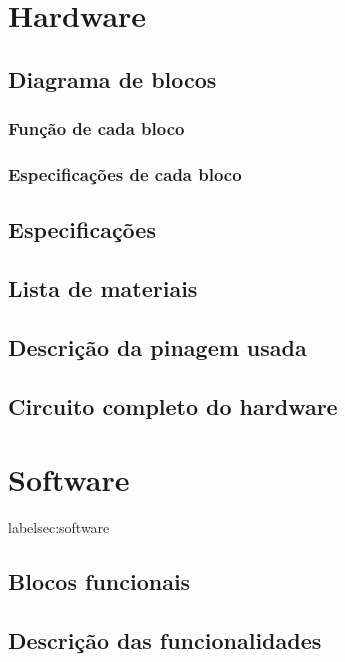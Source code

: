 \section{Hardware}\label{sec:desenvolvimento}

\subsection{Diagrama de blocos}


\subsubsection{Função de cada bloco}


\subsubsection{Especificações de cada bloco}


\subsection{Especificações}

\subsection{Lista de materiais}

\subsection{Descrição da pinagem usada}

\subsection{Circuito completo do hardware}


\section{Software}label{sec:software}

\subsection{Blocos funcionais}

\subsection{Descrição das funcionalidades}

